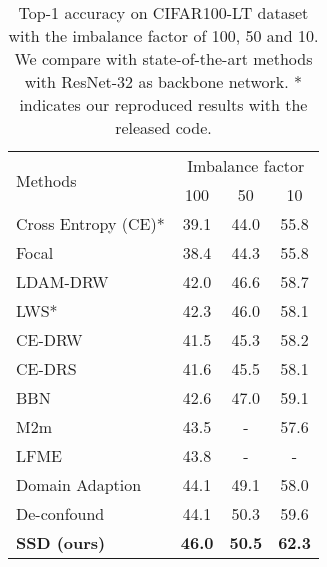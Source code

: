 \documentclass[10pt,twocolumn,letterpaper]{article}
\begin{document}
\begin{table}[t]
\centering
\footnotesize
\setlength{\tabcolsep}{8.2pt}
\vspace{1em}
\begin{tabular}{l|ccc}
\hline
\multirow{2}{*}{Methods} & \multicolumn{3}{c}{Imbalance factor} \\ \cline{2-4}
                         & 100        & 50         & 10         \\ \hline\hline
Cross Entropy (CE)*           & 39.1       & 44.0       & 55.8       \\
Focal~\cite{focal_loss} & 38.4       & 44.3       & 55.8       \\
LDAM-DRW~\cite{LDAM}         & 42.0       & 46.6       & 58.7       \\
LWS*~\cite{decoupling}        & 42.3       & 46.0       & 58.1       \\
CE-DRW~\cite{bbn}            &  41.5      &  45.3      & 58.2       \\
CE-DRS~\cite{bbn}           &   41.6     &  45.5       & 58.1       \\
BBN~\cite{bbn}               & 42.6       & 47.0       & 59.1       \\
M2m~\cite{M2m}               & 43.5       & -          & 57.6 \\
LFME~\cite{LFME}             & 43.8       & -       & -       \\
Domain Adaption~\cite{domainadpation} & 44.1 & 49.1 & 58.0            \\
De-confound~\cite{Deconfound}   & 44.1       & 50.3       & 59.6       \\\hline
\textbf{SSD (ours)}                 & \textbf{46.0}       & \textbf{50.5}       & \textbf{62.3}       \\ \hline
\end{tabular}
\vspace{1em}
\caption{Top-1 accuracy on CIFAR100-LT dataset with the imbalance factor of 100, 50 and 10. We compare with state-of-the-art methods with ResNet-32 as backbone network. * indicates our reproduced results with the released code.}
\label{tab:cifar}
\end{table}
\end{document}
